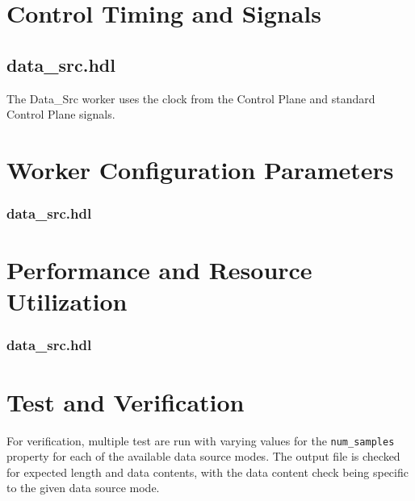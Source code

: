 \documentclass{article}
\def\comp{data\_src}
\edef\ecomp{data_src}
\def\Comp{TEMP}
\def\Comp{Data\_Src }
\begin{document}
\section*{Control Timing and Signals}
\subsection*{\comp.hdl}
\begin{flushleft}
  The \Comp worker uses the clock from the Control Plane and standard Control Plane signals.
\end{flushleft}

\begin{landscape}
\section*{Worker Configuration Parameters}
\subsubsection*{\comp.hdl}

\section*{Performance and Resource Utilization}
\subsubsection*{\comp.hdl}

\end{landscape}

\section*{Test and Verification}
\begin{flushleft}
\justify
For verification, multiple test are run with varying values for the \verb+num_samples+ property for each of the available data source modes. The output file is checked for expected length and data contents, with the data content check being specific to the given data source mode.
\end{flushleft}
\end{document}
